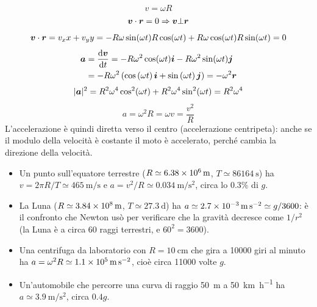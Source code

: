 \[v=\omega R\]
\[\boldsymbol{v}\cdot\boldsymbol{r}=0\Rightarrow\boldsymbol{v}\bot\boldsymbol{r}\]
\[\boldsymbol{v}\cdot\boldsymbol{r}=v_xx+v_yy=-R\omega\sin(\omega t)R\cos(\omega t)+R\omega\cos(\omega t)R\sin(\omega t)=0\]
\begin{align*}
  \boldsymbol{a} & =\frac{\mathrm{d}\boldsymbol{v}}{\mathrm{d} t}=-R\omega^2\cos(\omega t)\boldsymbol{i}-R\omega^2\sin(\omega t)\boldsymbol{j}                              \\
        & =-R\omega^2\left(\cos\left(\omega t\right)\boldsymbol{i}+
  \sin\left(\omega t\right)\boldsymbol{j}\right)=-\omega^2\boldsymbol{r}
\end{align*}
\[|\boldsymbol{a}|^2=R^2\omega^4\cos^2(\omega t)+R^2\omega^4\sin^2(\omega
  t)=R^2\omega^4\]
\[a=\omega^2R=\omega v=\frac{v^2}{R}\]
L'accelerazione è quindi diretta verso il centro (accelerazione centripeta): anche se il modulo della velocità è costante il moto è accelerato, perché cambia la direzione della velocità.
\begin{Es}
  \begin{itemize}
    \item Un punto sull'equatore terrestre ($R\simeq\SI{6.38E6}{\meter}$, $T\simeq\SI{86164}{\second}$) ha $v=2\pi R/T\simeq\SI{465}{\meter\per\second}$ e $a=v^2/R\simeq\SI{0.034}{\meter\per\second\squared}$, circa lo 0.3\% di $g$.
    \item La Luna ($R\simeq\SI{3.84E8}{\meter}$, $T\simeq\SI{27.3}{\day}$) ha $a\simeq\SI{2.7E-3}{\meter\per\second\squared}\simeq g/3600$: è il confronto che Newton usò per verificare che la gravità decresce come $1/r^2$~\cite{newton1687} (la Luna è a circa 60 raggi terrestri, e $60^2=3600$).
    \item Una centrifuga da laboratorio con $R=\SI{10}{\centi\meter}$ che gira a \num{10000} giri al minuto ha $a=\omega^2R\simeq\SI{1.1E5}{\meter\per\second\squared}$, cioè circa \num{11000} volte $g$.
    \item Un'automobile che percorre una curva di raggio \SI{50}{\meter} a \SI{50}{\kilo\meter\per\hour} ha $a\simeq\SI{3.9}{\meter\per\second\squared}$, circa $0.4g$.
  \end{itemize}
\end{Es}

